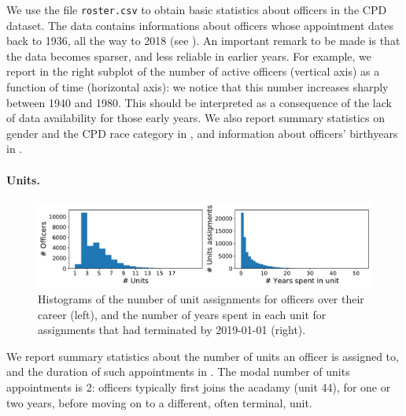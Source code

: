 We use the file \texttt{roster.csv} to obtain basic statistics about officers in the CPD dataset. The data contains informations about officers whose appointment dates back to 1936, all the way to 2018 (see ). An important remark to be made is that the data becomes sparser, and less reliable in earlier years. For example, we report in the right subplot of  the number of active officers (vertical axis) as a function of time (horizontal axis): we notice that this number increases sharply between 1940 and 1980. This should be interpreted as a consequence of the lack of data availability for those early years. We also report summary statistics on gender and the CPD race category in , and information about officers' birthyears in .

\paragraph{Units.} 
\begin{figure}[h] 
	\includegraphics[width=\textwidth]{figs/units_officers} 
	\caption{Histograms of the number of unit assignments for
officers over their career (left), and the number of years spent in each unit for assignments that had terminated by 2019-01-01 (right).}
\label{fig:units}
\end{figure}


We report summary statistics about the number of units an officer is assigned to, and the duration of such appointments in . The modal number of units appointments is 2: officers typically first joins the acadamy (unit 44), for one or two years, before moving on to a different, often terminal, unit. 
 
